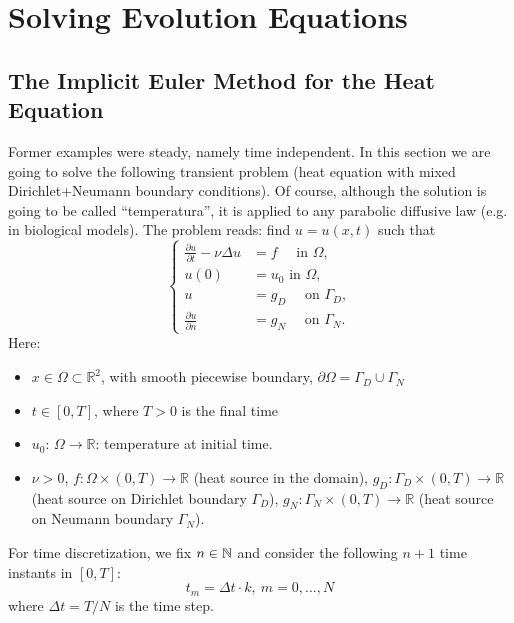 \documentclass[12pt]{article}
\newcommand{\R}{{\mathbb R}}
\begin{document}
\section{Solving Evolution Equations}
\label{sec:solv-evol-equat}

\subsection{The Implicit Euler Method for the Heat Equation}
\label{sec:heat-equation}
\newcommand{\deltaT}{\Delta t}

Former examples were steady, namely time independent. In this section
we are going to solve the following transient problem (heat equation
with mixed Dirichlet+Neumann boundary conditions). Of course, although
the solution is going to be called ``temperatura'', it is applied to
any parabolic diffusive law (e.g. in biological models). The problem
reads: find $u=u(x,t)$ such that
\begin{equation}
  \label{eq:heat equation}
  \left\{
    \begin{aligned}
      \frac{\partial u}{\partial t} -\nu\Delta u &= f \quad \text{ in } \Omega, \\
      u(0)&=u_0 \text{ in } \Omega, \\
      u &= g_D \quad \text{ on } \Gamma_D, \\
      \frac{\partial u}{\partial n} &= g_N \quad \text{ on } \Gamma_N.
    \end{aligned}
    \right.
\end{equation}
Here:
\begin{itemize}
\item $x\in\Omega\subset\R^2$, with smooth piecewise boundary,  $\partial\Omega=\Gamma_D\cup\Gamma_N$
\item $t\in [0,T]$, where $T>0$ is the final time
\item $u_0$: $\Omega\to\R$: temperature at initial time.
\item $\nu>0$, $f:\Omega\times(0,T)\to\R$ (heat source in the domain),
  $g_D:\Gamma_D\times(0,T)\to\R$ (heat source on Dirichlet boundary $\Gamma_D$),
  $g_N:\Gamma_N\times(0,T)\to\R$ (heat source on Neumann boundary $\Gamma_N$).
\end{itemize}

For time discretization, we fix $n\in{\mathbb N}$ and consider the
following $n+1$ time instants in $[0,T]$:
$$t_m= \deltaT\cdot k, \ m=0, ..., N$$
where $\deltaT=T/N$ is the time step.
\end{document}
